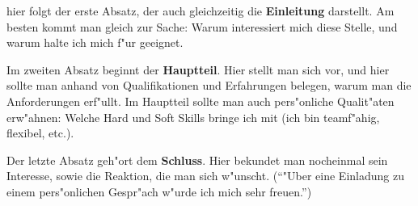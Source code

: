 \documentclass[12pt,german]{g-brief}
\begin{document}
\begin{g-brief}
hier folgt der erste Absatz, der auch gleichzeitig die
\textbf{Einleitung} darstellt. Am besten kommt man gleich zur
Sache: Warum interessiert mich diese Stelle, und warum halte
ich mich f"ur geeignet.
 
Im zweiten Absatz beginnt der \textbf{ Hauptteil}. Hier stellt
man sich vor, und hier sollte man anhand von Qualifikationen
und Erfahrungen belegen, warum man die Anforderungen
erf"ullt. Im Hauptteil sollte man auch pers"onliche Qualit"aten
erw"ahnen: Welche Hard und Soft Skills bringe ich mit (ich bin
teamf"ahig, flexibel, etc.).
 
Der letzte Absatz geh"ort dem \textbf{Schluss}. Hier bekundet
man nocheinmal sein Interesse, sowie die Reaktion, die man sich
w"unscht. ("`"Uber eine Einladung zu einem pers"onlichen
Gespr"ach w"urde ich mich sehr freuen."')
\end{g-brief}
\end{document}
